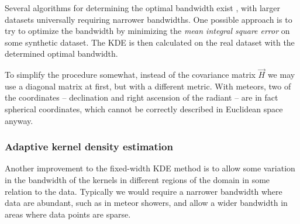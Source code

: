             Several algorithms for determining the optimal bandwidth exist \citep{bowman1985,jones+1996},
            with larger datasets universally requiring narrower bandwidths.
            One possible approach is to try to optimize the bandwidth by minimizing the
            \emph{mean integral square error} on some synthetic dataset.
            The KDE is then calculated on the real dataset with the determined optimal bandwidth.

            To simplify the procedure somewhat, instead of the covariance matrix $\vec{H}$ we may use a diagonal matrix at first,
            but with a different metric. With meteors, two of the coordinates -- declination
            and right ascension of the radiant -- are in fact spherical coordinates,
            which cannot be correctly described in Euclidean space anyway.

        \subsubsection{Adaptive kernel density estimation} \label{mmka}
            Another improvement to the fixed-width KDE method is to allow some variation in the bandwidth
            of the kernels in different regions of the domain in some relation to the data.
            Typically we would require a narrower bandwidth where data are abundant,
            such as in meteor showers, and allow a wider bandwidth in areas where data points are sparse.
